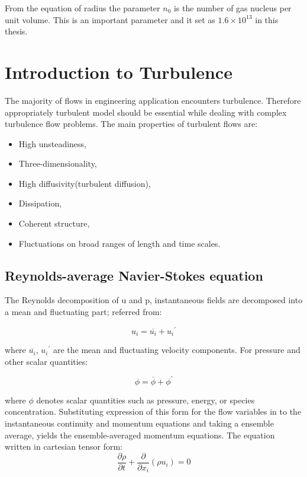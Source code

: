 From the equation of radius the parameter $n_0$ is the number of gas
nucleus per unit volume. This is an important parameter and it set as
$1.6 \times 10^{13}$ in this thesis.
  
\section{Introduction to Turbulence}

The majority of flows in engineering application encounters
turbulence\cite{ANSYS}. Therefore appropriately turbulent model should
be essential while dealing with complex turbulence flow problems.  The
main properties of turbulent flows are:

\begin{itemize}
\item High unsteadiness,
\item Three-dimensionality,
\item High diffusivity(turbulent diffusion),
\item Dissipation,
\item Coherent structure,
\item Fluctuations on broad ranges of length and time scales.
\end{itemize}
\subsection{Reynolds-average Navier-Stokes equation}

The Reynolds decomposition of u and p, instantaneous fields are
decomposed into a mean and fluctuating part; referred
from\cite{pope2000,ANSYS}:

\begin{equation}
{u_i}={\overline{u_i}}+{{u_i}^\prime}
\end{equation}

where ${\overline{u_i}}$, ${{u_i}^\prime}$ are the mean and
fluctuating velocity components.  For pressure and other scalar
quantities:

\begin{equation}
\phi ={\overline{\phi}}+{{\phi}^\prime}
\end{equation}

where $\phi$ denotes scalar quantities such as pressure, energy, or
species concentration.  Substituting expression of this form for the
flow variables in to the instantaneous continuity and momentum
equations and taking a ensemble average, yields the ensemble-averaged
momentum equations. The equation written in cartesian tensor form:
\begin{equation}
{{\frac{\partial \rho}{\partial t}}+{\frac{\partial}{\partial {x_i}}}(\rho u_i)}=0
\end{equation}

